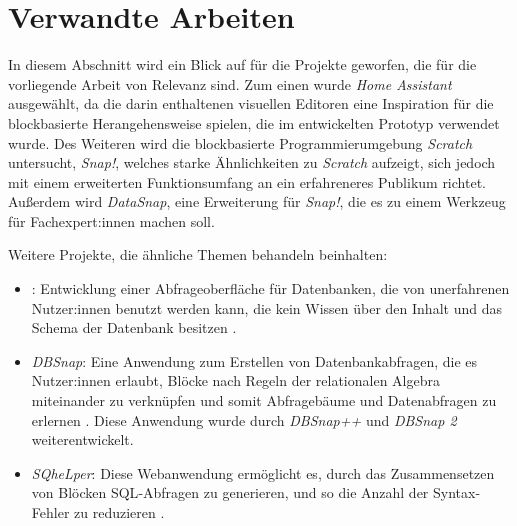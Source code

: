 \section{Verwandte Arbeiten}

In diesem Abschnitt wird ein Blick auf für die Projekte geworfen, die für die vorliegende Arbeit von Relevanz sind. Zum einen wurde \textit{Home Assistant} ausgewählt, da die darin enthaltenen visuellen Editoren eine Inspiration für die blockbasierte Herangehensweise spielen, die im entwickelten Prototyp verwendet wurde. Des Weiteren wird die blockbasierte Programmierumgebung \textit{Scratch} untersucht, \textit{Snap!}, welches starke Ähnlichkeiten zu \textit{Scratch} aufzeigt, sich jedoch mit einem erweiterten Funktionsumfang an ein erfahreneres Publikum richtet. Außerdem wird \textit{DataSnap}, eine Erweiterung für \textit{Snap!}, die es zu einem Werkzeug für Fachexpert:innen machen soll.

Weitere Projekte, die ähnliche Themen behandeln beinhalten:
\begin{itemize}
  \item \textit{}: Entwicklung einer Abfrageoberfläche für Datenbanken, die von unerfahrenen Nutzer:innen benutzt werden kann, die kein Wissen über den Inhalt und das Schema der Datenbank besitzen \parencite{pazosr.InterfaceComposing2015}.
  \item \textit{DBSnap}: Eine Anwendung zum Erstellen von Datenbankabfragen, die es Nutzer:innen erlaubt, Blöcke nach Regeln der relationalen Algebra miteinander zu verknüpfen und somit Abfragebäume und Datenabfragen zu erlernen \parencite{silvaDBSnapLearning2015}. Diese Anwendung wurde durch \textit{DBSnap++} \parencite{silvaDBSnapCreating2018} und \textit{DBSnap 2} \parencite{silvaDBSnapNew2022} weiterentwickelt.
  \item \textit{SQheLper}: Diese Webanwendung ermöglicht es, durch das Zusammensetzen von Blöcken \acs{SQL}-Abfragen zu generieren, und so die Anzahl der Syntax-Fehler zu reduzieren \parencite{jacobsSQheLperBlockbased2021}.
\end{itemize}
